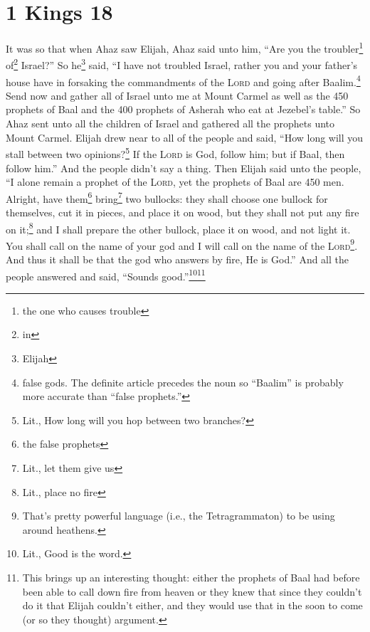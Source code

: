 \section{1 Kings 18}\label{1 Kings 18}
\begin{enumerate}
     It was so that when Ahaz saw Elijah, Ahaz said unto him, ``Are you the troubler\footnote{the one who causes trouble} of\footnote{in} Israel?''%
     So he\footnote{Elijah} said, ``I have not troubled Israel, rather you and your father's house have in forsaking the commandments of the \textsc{Lord} and going after Baalim.\footnote{false gods. The definite article precedes the noun so ``Baalim'' is probably more accurate than ``false prophets.''}%
     Send now and gather all of Israel unto me at Mount Carmel as well as the 450 prophets of Baal and the 400 prophets of Asherah who eat at Jezebel's table.''%
     So Ahaz sent unto all the children of Israel and gathered all the prophets unto Mount Carmel.%
     Elijah drew near to all of the people and said, ``How long will you stall between two opinions?\footnote{Lit., How long will you hop between two branches?} If the \textsc{Lord} is God, follow him; but if Baal, then follow him.'' And the people didn't say a thing.%
     Then Elijah said unto the people, ``I alone remain a prophet of the \textsc{Lord}, yet the prophets of Baal are 450 men.%
     Alright, have them\footnote{the false prophets} bring\footnote{Lit., let them give us} two bullocks: they shall choose one bullock for themselves, cut it in pieces, and place it on wood, but they shall not put any fire on it;\footnote{Lit., place no fire} and I shall prepare the other bullock, place it on wood, and not light it.%
     You shall call on the name of your god and I will call on the name of the \textsc{Lord}\footnote{That's pretty powerful language (i.e., the Tetragrammaton) to be using around heathens.}. And thus it shall be that the god who answers by fire, He is God.'' And all the people answered and said, ``Sounds good.''\footnote{Lit., Good is the word.}\footnote{This brings up an interesting thought: either the prophets of Baal had before been able to call down fire from heaven or they knew that since they couldn't do it that Elijah couldn't either, and they would use that in the soon to come (or so they thought) argument.}%

\end{enumerate}
